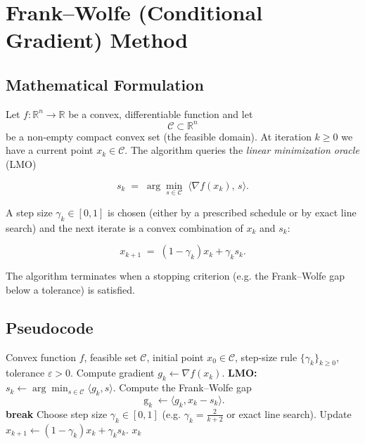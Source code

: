 \documentclass{article}
\newcommand{\gap}{\operatorname{g}}
\begin{document}
\section*{Frank–Wolfe (Conditional Gradient) Method}

\subsection*{Mathematical Formulation}
Let $f:\mathbb{R}^n\rightarrow\mathbb{R}$ be a convex, differentiable function and let 
\[
\mathcal{C}\subset\mathbb{R}^n
\]
be a non‑empty compact convex set (the feasible domain).  
At iteration $k\ge 0$ we have a current point $x_k\in\mathcal{C}$.  
The algorithm queries the \emph{linear minimization oracle} (LMO)

\[
s_k \;=\; \arg\min_{s\in\mathcal{C}}\;\langle\nabla f(x_k),\,s\rangle .
\tag{1}
\]

A step size $\gamma_k\in[0,1]$ is chosen (either by a prescribed schedule or by exact line search) and the next iterate is a convex combination of $x_k$ and $s_k$:

\[
x_{k+1}\;=\;(1-\gamma_k)x_k+\gamma_k s_k .
\tag{2}
\]

The algorithm terminates when a stopping criterion (e.g. the Frank–Wolfe gap below a tolerance) is satisfied.

\subsection*{Pseudocode}
\begin{algorithm}[H]
\caption{Frank–Wolfe Method}
\begin{algorithmic}[1]
\REQUIRE Convex function $f$, feasible set $\mathcal{C}$, initial point $x_0\in\mathcal{C}$, 
step‑size rule $\{\gamma_k\}_{k\ge0}$, tolerance $\varepsilon>0$.
    \STATE Compute gradient $g_k \gets \nabla f(x_k)$.
    \STATE \textbf{LMO:} $s_k \gets \displaystyle\arg\min_{s\in\mathcal{C}}\langle g_k,s\rangle$.
    \STATE Compute the Frank–Wolfe gap 
          \[
          \gap_k \gets \langle g_k, x_k-s_k\rangle .
          \]
    \IF{$\gap_k \le \varepsilon$}
        \STATE \textbf{break}
    \ENDIF
    \STATE Choose step size $\gamma_k\in[0,1]$ (e.g. $\gamma_k = \frac{2}{k+2}$ or exact line search).
    \STATE Update $x_{k+1} \gets (1-\gamma_k)x_k + \gamma_k s_k$.
\ENDFOR
\RETURN $x_k$
\end{algorithmic}
\end{algorithm}
\end{document}
